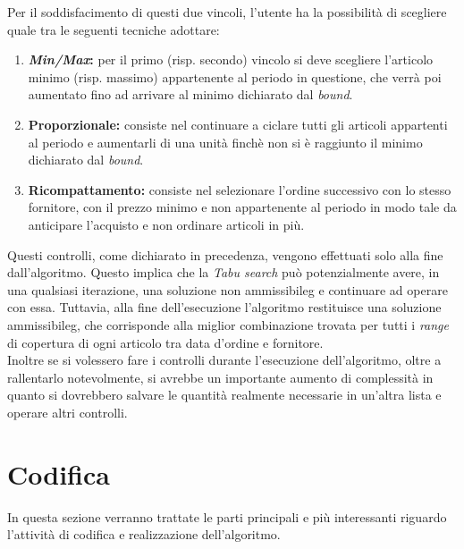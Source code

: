 Per il soddisfacimento di questi due vincoli, l'utente ha la
possibilità di scegliere quale tra le seguenti tecniche adottare:
\begin{enumerate}
    \item \textbf{\textit{Min/Max}:} per il primo (risp. secondo) vincolo
    si deve scegliere l'articolo minimo (risp. massimo) appartenente al periodo in questione,
    che verrà poi aumentato fino ad arrivare al
    minimo dichiarato dal \textit{bound}.
    \item \textbf{Proporzionale:} consiste nel continuare a ciclare
    tutti gli articoli appartenti al periodo e aumentarli di
    una unità finchè non si è raggiunto il minimo
    dichiarato dal \textit{bound}.
    \item \textbf{Ricompattamento:} consiste nel selezionare l'ordine
    successivo con lo stesso fornitore, con il prezzo minimo e
    non appartenente al periodo in modo tale da anticipare l'acquisto
    e non ordinare articoli in più.
\end{enumerate}
\vspace*{0.5cm}
\noindent Questi controlli, come dichiarato in precedenza, vengono effettuati solo alla fine dall'algoritmo.
Questo implica che la \textit{Tabu search} può potenzialmente avere, in
una qualsiasi iterazione, una soluzione non \gls{ammissibileg} e
continuare ad operare con essa. Tuttavia, alla fine dell'esecuzione
l'algoritmo restituisce una soluzione \gls{ammissibileg}, che corrisponde
alla miglior combinazione trovata per tutti i \textit{range} di copertura di
ogni articolo tra data d'ordine e fornitore.\\
Inoltre se si volessero fare i controlli durante l'esecuzione dell'algoritmo,
oltre a rallentarlo notevolmente, si avrebbe un importante aumento di
complessità in quanto si dovrebbero salvare le quantità realmente
necessarie in un'altra lista e operare altri controlli.

\newpage

\section{Codifica}
\label{sec:codifica}
\noindent In questa sezione verranno trattate le parti principali e più interessanti riguardo l'attività
di codifica e realizzazione dell'algoritmo.

